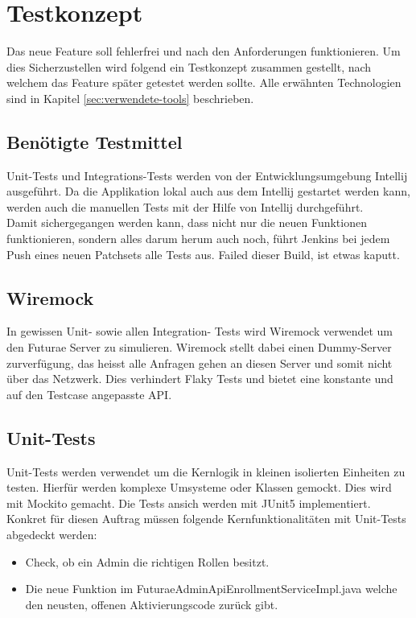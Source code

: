 \section{Testkonzept}
Das neue Feature soll fehlerfrei und nach den Anforderungen funktionieren. Um dies Sicherzustellen wird folgend ein Testkonzept zusammen gestellt, nach welchem das Feature später getestet werden sollte.
Alle erwähnten Technologien sind in Kapitel \ref{sec:verwendete-tools} beschrieben.


\subsection{Benötigte Testmittel}
Unit-Tests und Integrations-Tests werden von der Entwicklungsumgebung Intellij ausgeführt. Da die Applikation lokal auch aus dem Intellij gestartet werden kann, werden auch die manuellen Tests mit der Hilfe von Intellij durchgeführt.  \newline
\\
Damit sichergegangen werden kann, dass nicht nur die neuen Funktionen funktionieren, sondern alles darum herum auch noch, führt Jenkins bei jedem Push eines neuen Patchsets alle Tests aus. Failed dieser Build, ist etwas kaputt.

\subsection{Wiremock} \label{subsec:wiremock}
In gewissen Unit- sowie allen Integration- Tests wird Wiremock verwendet um den Futurae Server zu simulieren. Wiremock stellt dabei einen Dummy-Server zurverfügung, das heisst alle Anfragen gehen an diesen Server und somit nicht über das Netzwerk. Dies verhindert Flaky Tests und bietet eine konstante und auf den Testcase angepasste API. 

\subsection{Unit-Tests}
Unit-Tests werden verwendet um die Kernlogik in kleinen isolierten Einheiten zu testen. Hierfür werden komplexe Umsysteme oder Klassen gemockt. Dies wird mit Mockito gemacht. Die Tests ansich werden mit JUnit5 implementiert. Konkret für diesen Auftrag müssen folgende Kernfunktionalitäten mit Unit-Tests abgedeckt werden:
\begin{itemize}
	\item Check, ob ein Admin die richtigen Rollen besitzt.
	\item Die neue Funktion im FuturaeAdminApiEnrollmentServiceImpl.java welche den neusten, offenen Aktivierungscode zurück gibt.	
\end{itemize}

